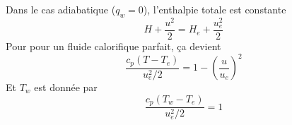       Dans le cas adiabatique ($q_w = 0$), l'enthalpie totale est constante
      \begin{equation}
        H + \frac{u^2}{2} = H_e + \frac{u_e^2}{2}
      \end{equation}
      Pour pour un fluide calorifique parfait, ça devient
      \begin{equation}
        \frac{c_p(T-T_e)}{u_e^2/2} = 1 - \left(\frac{u}{u_e}\right)^2
      \end{equation}
      Et $T_w$ est donnée par
      \begin{equation}
        \frac{c_p(T_w - T_e)}{u_e^2 /2} = 1
      \end{equation}
